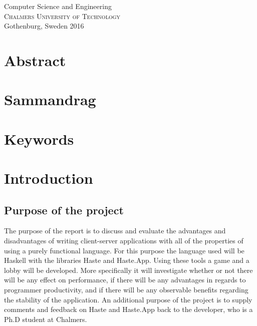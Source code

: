 \documentclass[a4paper]{article}
\begin{document}
\maketitle
{}
\vfill

\begin{center}
\large
Computer Science and Engineering\\
\textsc{Chalmers University of Technology} \\
Gothenburg, Sweden 2016 \\
\normalsize
\end{center}

\newpage
\section*{Abstract}
\section*{Sammandrag}
\section*{Keywords}
\newpage
\listoftodos
\tableofcontents
\listoffigures

\newpage
{}

\section{Introduction}
\subsection{Purpose of the project}
\label{sec:purpose}
The purpose of the report is to discuss and evaluate the advantages and disadvantages of writing client-server applications with all of the properties of using a purely functional language. For this purpose the language used will be Haskell with the libraries Haste and Haste.App. Using these tools a game and a lobby will be developed. More specifically it will investigate whether or not there will be any effect on performance, if there will be any advantages in regards to programmer productivity, and if there will be any observable benefits regarding the stability of the application. An additional purpose of the project is to supply comments and feedback on Haste and Haste.App back to the developer, who is a Ph.D student at Chalmers.
\end{document}
